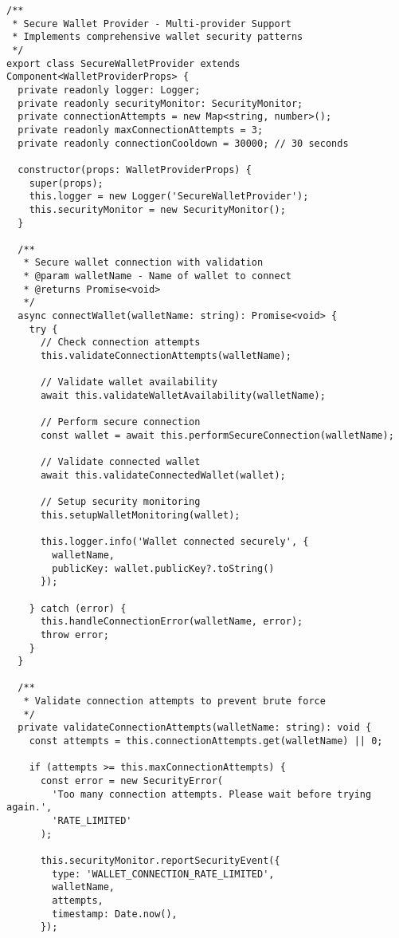 \documentclass[11pt,a4paper]{article}
\begin{document}
\begin{lstlisting}[style=typescript, caption=Secure Wallet Provider Implementation]
/**
 * Secure Wallet Provider - Multi-provider Support
 * Implements comprehensive wallet security patterns
 */
export class SecureWalletProvider extends Component<WalletProviderProps> {
  private readonly logger: Logger;
  private readonly securityMonitor: SecurityMonitor;
  private connectionAttempts = new Map<string, number>();
  private readonly maxConnectionAttempts = 3;
  private readonly connectionCooldown = 30000; // 30 seconds

  constructor(props: WalletProviderProps) {
    super(props);
    this.logger = new Logger('SecureWalletProvider');
    this.securityMonitor = new SecurityMonitor();
  }

  /**
   * Secure wallet connection with validation
   * @param walletName - Name of wallet to connect
   * @returns Promise<void>
   */
  async connectWallet(walletName: string): Promise<void> {
    try {
      // Check connection attempts
      this.validateConnectionAttempts(walletName);

      // Validate wallet availability
      await this.validateWalletAvailability(walletName);

      // Perform secure connection
      const wallet = await this.performSecureConnection(walletName);

      // Validate connected wallet
      await this.validateConnectedWallet(wallet);

      // Setup security monitoring
      this.setupWalletMonitoring(wallet);

      this.logger.info('Wallet connected securely', { 
        walletName,
        publicKey: wallet.publicKey?.toString() 
      });

    } catch (error) {
      this.handleConnectionError(walletName, error);
      throw error;
    }
  }

  /**
   * Validate connection attempts to prevent brute force
   */
  private validateConnectionAttempts(walletName: string): void {
    const attempts = this.connectionAttempts.get(walletName) || 0;
    
    if (attempts >= this.maxConnectionAttempts) {
      const error = new SecurityError(
        'Too many connection attempts. Please wait before trying again.',
        'RATE_LIMITED'
      );
      
      this.securityMonitor.reportSecurityEvent({
        type: 'WALLET_CONNECTION_RATE_LIMITED',
        walletName,
        attempts,
        timestamp: Date.now(),
      });


\end{lstlisting}
\end{document}
